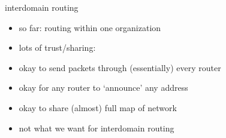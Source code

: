 \usetikzlibrary{arrows.meta,shapes,quotes}
\begin{frame}{interdomain routing}
    \begin{itemize}
    \item so far: routing within one organization
    \item lots of trust/sharing:
    \vspace{.5cm}
    \item okay to send packets through (essentially) every router
    \item okay for any router to `announce' any address
    \item okay to share (almost) full map of network
    \vspace{.5cm}
    \item not what we want for interdomain routing
    \end{itemize}
\end{frame}

